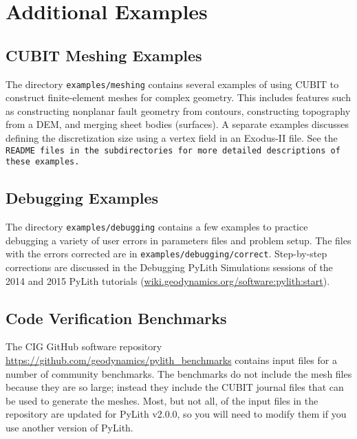  



\section{Additional Examples}


\subsection{CUBIT Meshing Examples}

The directory \texttt{examples/meshing} contains several examples
of using CUBIT to construct finite-element meshes for complex geometry.
This includes features such as constructing nonplanar fault geometry
from contours, constructing topography from a DEM, and merging sheet
bodies (surfaces). A separate examples discusses defining the discretization
size using a vertex field in an Exodus-II file. See the \texttt{README
files in the subdirectories for more detailed descriptions of these
examples.}


\subsection{\label{sub:debugging:examples}Debugging Examples}

The directory \texttt{examples/debugging} contains a few examples
to practice debugging a variety of user errors in parameters files
and problem setup. The files with the errors corrected are in \texttt{examples/debugging/correct}.
Step-by-step corrections are discussed in the Debugging PyLith Simulations
sessions of the 2014 and 2015 PyLith tutorials (\url{wiki.geodynamics.org/software:pylith:start}).


\subsection{Code Verification Benchmarks}

The CIG GitHub software repository \url{https://github.com/geodynamics/pylith_benchmarks}
contains input files for a number of community benchmarks. The benchmarks
do not include the mesh files because they are so large; instead they
include the CUBIT journal files that can be used to generate the meshes.
Most, but not all, of the input files in the repository are updated
for PyLith v2.0.0, so you will need to modify them if you use another
version of PyLith.
